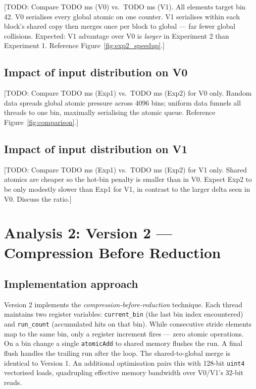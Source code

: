 \documentclass[11pt, letterpaper]{article}
\newcommand{\EOneVZeroAvg}{TODO}
\newcommand{\EOneVOneAvg}{TODO}
\newcommand{\ETwoVZeroAvg}{TODO}
\newcommand{\ETwoVOneAvg}{TODO}
\begin{document}
[TODO: Compare \ETwoVZeroAvg{} ms (V0) vs.\ \ETwoVOneAvg{} ms (V1).
All elements target bin 42.  V0 serialises every global atomic on one
counter.  V1 serialises within each block's shared copy then merges once
per block to global — far fewer global collisions.
Expected: V1 advantage over V0 is \emph{larger} in Experiment 2 than
Experiment 1.  Reference Figure~\ref{fig:exp2_speedup}.]

\subsection*{Impact of input distribution on V0}

[TODO: Compare \EOneVZeroAvg{} ms (Exp1) vs.\ \ETwoVZeroAvg{} ms (Exp2)
for V0 only.  Random data spreads global atomic pressure across 4096 bins;
uniform data funnels all threads to one bin, maximally serialising the
atomic queue.  Reference Figure~\ref{fig:comparison}.]

\subsection*{Impact of input distribution on V1}

[TODO: Compare \EOneVOneAvg{} ms (Exp1) vs.\ \ETwoVOneAvg{} ms (Exp2)
for V1 only.  Shared atomics are cheaper so the hot-bin penalty is smaller
than in V0.  Expect Exp2 to be only modestly slower than Exp1 for V1,
in contrast to the larger delta seen in V0.  Discuss the ratio.]

\section{Analysis 2: Version 2 — Compression Before Reduction}

\subsection*{Implementation approach}

Version 2 implements the \emph{compression-before-reduction} technique.
Each thread maintains two register variables: \texttt{current\_bin}
(the last bin index encountered) and \texttt{run\_count}
(accumulated hits on that bin).  While consecutive stride elements map to
the same bin, only a register increment fires — zero atomic operations.
On a bin change a single \texttt{atomicAdd} to shared memory flushes the
run.  A final flush handles the trailing run after the loop.
The shared-to-global merge is identical to Version 1.
An additional optimisation pairs this with 128-bit \texttt{uint4} vectorised
loads, quadrupling effective memory bandwidth over V0/V1's 32-bit reads.
\end{document}
